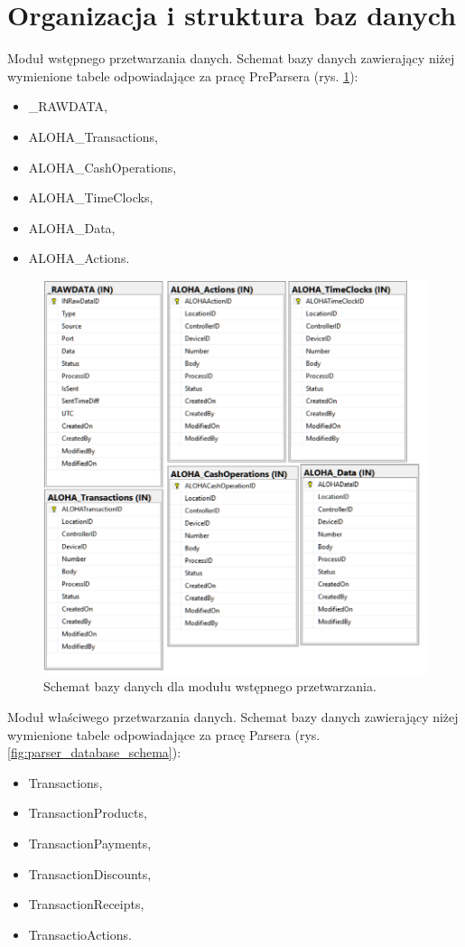 \documentclass[a4paper]{book}
\begin{document}
\section{Organizacja i struktura baz danych}
Moduł wstępnego przetwarzania danych.
Schemat bazy danych zawierający niżej wymienione tabele odpowiadające za pracę PreParsera (rys. \ref{fig:preparser_database_schema}):
  \begin{itemize}
	\item \_RAWDATA,
	\item ALOHA\_Transactions,
	\item ALOHA\_CashOperations,
	\item ALOHA\_TimeClocks,
	\item ALOHA\_Data,
	\item ALOHA\_Actions.
\end{itemize}
\begin{figure}[t]
	\centering
	\includegraphics[width=\textwidth]{./img/preparser_database_schema.png}
	\caption{Schemat bazy danych dla modułu wstępnego przetwarzania.}
	\label{fig:preparser_database_schema}
\end{figure}
Moduł właściwego przetwarzania danych.
Schemat bazy danych zawierający niżej wymienione tabele odpowiadające za pracę Parsera (rys. \ref{fig:parser_database_schema}):
\begin{itemize}
	\item Transactions,
	\item TransactionProducts,
	\item TransactionPayments,
	\item TransactionDiscounts,
	\item TransactionReceipts,
	\item TransactioActions.
\end{itemize}
\end{document}
